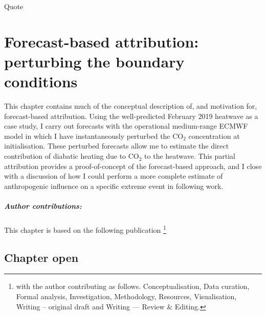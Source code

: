 {\onehalfspacing%
\begin{savequote}[8cm]
    Quote
\end{savequote}
    
\chapter{\label{ch3}Forecast-based attribution: perturbing the boundary conditions}

This chapter contains much of the conceptual description of, and motivation for, forecast-based attribution. Using the well-predicted February 2019 heatwave as a case study, I carry out forecasts with the operational medium-range ECMWF model in which I have instantaneously perturbed the CO$_2$ concentration at initialisation. These perturbed forecasts allow me to estimate the direct contribution of diabatic heating due to CO$_2$ to the heatwave. This partial attribution provides a proof-of-concept of the forecast-based approach, and I close with a discussion of how I could perform a more complete estimate of anthropogenic influence on a specific extreme event in following work.
{\small\paragraph{Author contributions:} This chapter is based on the following publication \footnote{with the author contributing as follows. Conceptualisation, Data curation, Formal analysis, Investigation, Methodology, Resources, Visualisation, Writing -- original draft and Writing --- Review \& Editing.} \par\vspace{1em}
}

\clearpage

\minitoc

\clearpage}

\section{Chapter open}\label{ch3:open}

